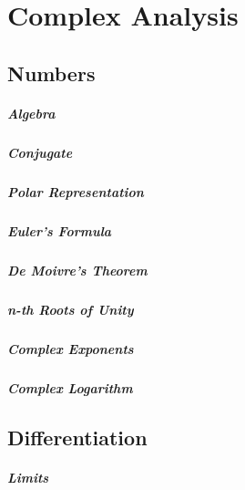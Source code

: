 \chapter{Complex Analysis}

\section{Numbers}

\paragraph{Algebra}

\paragraph{Conjugate}

\paragraph{Polar Representation}

\paragraph{Euler's Formula}

\paragraph{De Moivre's Theorem}

\paragraph{n-th Roots of Unity}

\paragraph{Complex Exponents}

\paragraph{Complex Logarithm}


\section{Differentiation}

\paragraph{Limits}

